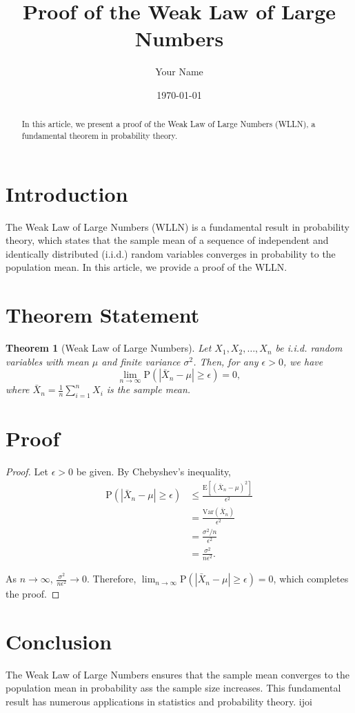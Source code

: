 \documentclass{article}
\title{Proof of the Weak Law of Large Numbers}
\author{Your Name}
\date{\today}
\newtheorem{theorem}{Theorem}
\begin{document}
\maketitle

\begin{abstract}
    In this article, we present a proof of the Weak Law of Large Numbers (WLLN), a fundamental theorem in probability theory.
\end{abstract}

\section{Introduction}

The Weak Law of Large Numbers (WLLN) is a fundamental result in probability theory, which states that the sample mean of a sequence of independent and identically distributed (i.i.d.) random variables converges in probability to the population mean. In this article, we provide a proof of the WLLN.

\section{Theorem Statement}

\begin{theorem}[Weak Law of Large Numbers]
    Let $X_1, X_2, \ldots, X_n$ be i.i.d. random variables with mean $\mu$ and finite variance $\sigma^2$. Then, for any $\epsilon > 0$, we have
    \[
        \lim_{n \to \infty} \mathrm{P}\left(|\bar{X}_n - \mu| \geq \epsilon\right) = 0,
    \]
    where $\bar{X}_n = \frac{1}{n} \sum_{i=1}^{n} X_i$ is the sample mean.
\end{theorem}

\section{Proof} 

\begin{proof}
    Let $\epsilon > 0$ be given. By Chebyshev's inequality,
    \begin{align*}
        \mathrm{P}\left(|\bar{X}_n - \mu| \geq \epsilon\right) &\leq \frac{\mathrm{E}[(\bar{X}_n - \mu)^2]}{\epsilon^2} \\
        &= \frac{\mathrm{Var}(\bar{X}_n)}{\epsilon^2} \\
        &= \frac{\sigma^2/n}{\epsilon^2} \\
        &= \frac{\sigma^2}{n\epsilon^2} .
    \end{align*}
    
    As $n \to \infty$, $\frac{\sigma^2}{n\epsilon^2} \to 0$. Therefore, $\lim_{n \to \infty} \mathrm{P}\left(|\bar{X}_n - \mu| \geq \epsilon\right) = 0$, which completes the proof.
\end{proof}

\section{Conclusion}

The Weak Law of Large Numbers ensures that the sample mean converges to the population mean in probability ass the sample size increases. This fundamental result has numerous applications in statistics and probability theory.
ijoi
\end{document}
